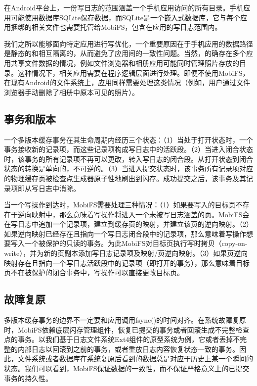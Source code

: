 在Android平台上，一份写日志的范围涵盖一个手机应用访问的所有目录。手机应用可能使用数据库SQLite保存数据，而SQLite是一个嵌入式数据库，它与每个应用捆绑的相关文件也需要托管给MobiFS，包含在应用的写日志范围内。
 
我们之所以能够面向特定应用进行写优化，一个重要原因在于手机应用的数据路径是静态的和相互隔离的，从而避免了应用间的一致性问题。当然，的确存在多个应用共享文件数据的情况，例如文件浏览器和相册应用可能同时管理照片存放的目录。这种情况下，相关应用需要在程序逻辑层面进行处理。即便不使用MobiFS，在现有Android的文件系统上，应用同样需要处理这类情况（例如，用户通过文件浏览器手动删除了相册中原本可见的照片）。 

\subsection{事务和版本}

一个多版本缓存事务在其生命周期内经历三个状态：（1）当处于打开状态时，一个事务接收新的记录项，而这些记录项构成写日志中的活跃段。（2）当进入闭合状态时，该事务的所有记录项不再可以更改，转入写日志的闭合段。从打开状态到闭合状态的转换是单向的，不可逆的。（3）当进入提交状态时，该事务所有记录项对应的物理缓存页被检查点生成器原子性地刷出到闪存。成功提交之后，该事务及其记录项即从写日志中消除。 
 
当一个写操作到达时，MobiFS需要处理三种情况：（1）如果要写入的目标页不存在于逆向映射中，那么意味着写操作将进入一个未被写日志涵盖的页。MobiFS会在写日志中追加一个记录项，建立到缓存页的映射，并建立该页的逆向映射。（2）如果逆向映射已经存在且指向一个写日志闭合段中的记录项，那么意味着写操作想要写入一个被保护的只读的事务。为此MobiFS对目标页执行写时拷贝（copy-on-write），并为新的页副本添加写日志记录项及映射/页逆向映射。（3）如果页逆向映射存在且指向一个写日志活跃段中的记录项（即打开的事务），那么意味着目标页不在被保护的闭合事务中，写操作可以直接更改目标页。

\subsection{故障复原}

多版本缓存事务的边界不一定要和应用调用fsync()的时间对齐。在系统故障复原时，MobiFS依赖底层闪存管理组件，恢复已提交的事务或者回滚生成不完整检查点的事务。以我们基于日志文件系统Ext4组件的原型系统为例，它或者丢掉不完整的内部日志以回滚到之前的事务，或者重放日志内容恢复状态一致的事务。因此，文件系统或者数据库在系统复原后看到的数据总是对应于历史上某一个瞬间的状态。我们可以看到，MobiFS保证数据的一致性，而不保证严格意义上的已提交事务的持久性。

